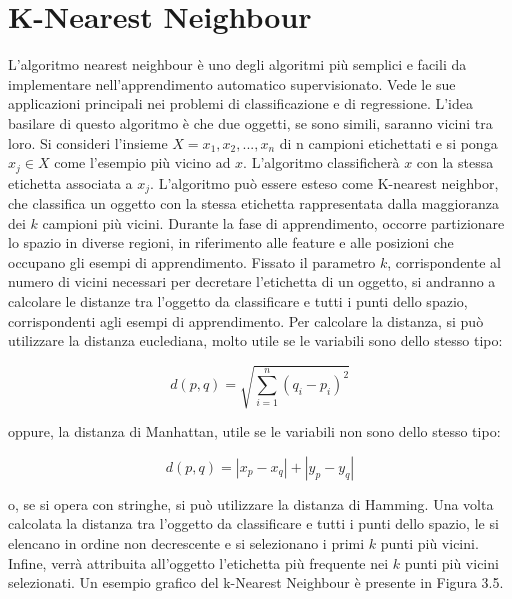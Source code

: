 \documentclass[11pt,  oneside, openany]{book}
\begin{document}
\section{ K-Nearest Neighbour}	
L'algoritmo nearest neighbour è uno degli algoritmi più semplici e facili da implementare nell'apprendimento automatico supervisionato. Vede le sue applicazioni principali nei problemi di classificazione e di regressione. L'idea basilare di questo algoritmo è che due oggetti, se sono simili, saranno vicini tra loro. Si consideri l'insieme $X={x_1, x_2, ..., x_n}$ di n campioni etichettati e si ponga $x_j \in X$ come l'esempio più vicino ad $x$. L'algoritmo classificherà $x$ con la stessa etichetta associata a $x_j$. L'algoritmo può essere esteso come  K-nearest neighbor, che classifica un oggetto con la stessa etichetta rappresentata dalla maggioranza dei $k$ campioni più vicini. Durante la fase di apprendimento, occorre partizionare lo spazio in diverse regioni, in riferimento alle feature e alle posizioni che occupano gli esempi di apprendimento. Fissato il parametro $k$, corrispondente al numero di vicini necessari per decretare l'etichetta di un oggetto, si andranno a calcolare le distanze tra l'oggetto da classificare e tutti i punti dello spazio, corrispondenti agli esempi di apprendimento. Per calcolare la distanza, si può utilizzare la distanza euclediana, molto utile se le variabili sono dello stesso tipo:

$$d\left( p,q\right)   = \sqrt {\sum _{i=1}^{n}  \left( q_{i}-p_{i}\right)^2 }$$

oppure, la distanza di Manhattan, utile se le variabili non sono dello stesso tipo:


$$  d\left( p,q\right) = |x_{p}-x_{q}|+|y_{p}-y_{q}| $$


o, se si opera con stringhe, si può utilizzare la distanza di Hamming. 
Una volta calcolata la distanza tra l'oggetto da classificare e tutti i punti dello spazio, le si elencano in ordine non decrescente e si selezionano i primi $k$ punti più vicini. Infine, verrà attribuita all'oggetto l'etichetta più frequente nei $k$ punti più vicini selezionati. 
Un esempio grafico del k-Nearest Neighbour è presente in Figura 3.5. 
\end{document}
